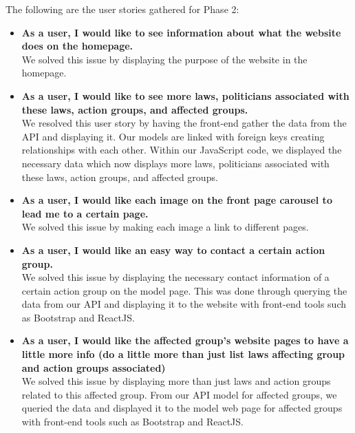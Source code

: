 \documentclass[12pt]{article}
\begin{document}
The following are the user stories gathered for Phase 2: \\
	
\begin{itemize}
	\item\textbf{As a user, I would like to see information about what the website does on the homepage.} \\
	We solved this issue by displaying the purpose of the website in the homepage.
	\\
	
	\item\textbf{As a user, I would like to see more laws, politicians associated with these laws, action groups, and affected groups.} \\
	We resolved this user story by having the front-end gather the data from the API and displaying it. Our models are linked with foreign keys creating relationships with each other. Within our JavaScript code, we displayed the necessary data which now displays more laws, politicians associated with these laws, action groups, and affected groups.
	\\
	
	\item\textbf{As a user, I would like each image on the front page carousel to lead me to a certain page.} \\
	We solved this issue by making each image a link to different pages.
	\\
	
	\item\textbf{As a user, I would like an easy way to contact a certain action group.} \\
	We solved this issue by displaying the necessary contact information of a certain action group on the model page. This was done through querying the data from our API and displaying it to the website with front-end tools such as Bootstrap and ReactJS.
	\\ 
	
	\item\textbf{As a user, I would like the affected group's website pages to have a little more info (do a little more than just list laws affecting group and action groups associated)} \\
	We solved this issue by displaying more than just laws and action groups related to this affected group. From our API model for affected groups, we queried the data and displayed it to the model web page for affected groups with front-end tools such as Bootstrap and ReactJS.
\end{itemize}
\end{document}

